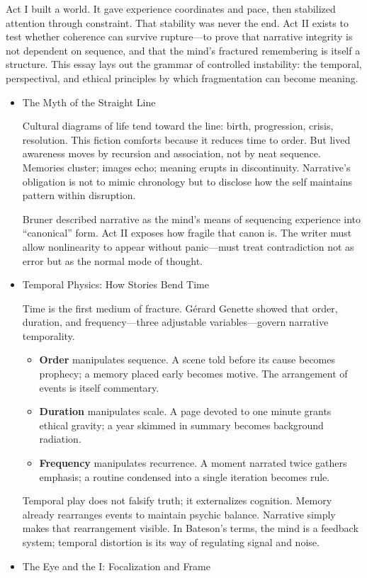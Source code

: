\documentclass[11pt]{article}
\begin{document}
Act I built a world. It gave experience coordinates and pace, then stabilized attention through constraint. That stability was never the end. Act II exists to test whether coherence can survive rupture—to prove that narrative integrity is not dependent on sequence, and that the mind’s fractured remembering is itself a structure. This essay lays out the grammar of controlled instability: the temporal, perspectival, and ethical principles by which fragmentation can become meaning.
\begin{itemize}
\item The Myth of the Straight Line
\label{sec:org8131407}

Cultural diagrams of life tend toward the line: birth, progression, crisis, resolution. This fiction comforts because it reduces time to order. But lived awareness moves by recursion and association, not by neat sequence. Memories cluster; images echo; meaning erupts in discontinuity. Narrative’s obligation is not to mimic chronology but to disclose how the self maintains pattern within disruption.

Bruner described narrative as the mind’s means of sequencing experience into “canonical” form. Act II exposes how fragile that canon is. The writer must allow nonlinearity to appear without panic—must treat contradiction not as error but as the normal mode of thought.
\item Temporal Physics: How Stories Bend Time
\label{sec:org3b10d78}

Time is the first medium of fracture. Gérard Genette showed that order, duration, and frequency—three adjustable variables—govern narrative temporality.

\begin{itemize}
\item \textbf{Order} manipulates sequence. A scene told before its cause becomes prophecy; a memory placed early becomes motive. The arrangement of events is itself commentary.
\item \textbf{Duration} manipulates scale. A page devoted to one minute grants ethical gravity; a year skimmed in summary becomes background radiation.
\item \textbf{Frequency} manipulates recurrence. A moment narrated twice gathers emphasis; a routine condensed into a single iteration becomes rule.
\end{itemize}

Temporal play does not falsify truth; it externalizes cognition. Memory already rearranges events to maintain psychic balance. Narrative simply makes that rearrangement visible. In Bateson’s terms, the mind is a feedback system; temporal distortion is its way of regulating signal and noise.
\item The Eye and the I: Focalization and Frame
\label{sec:org1b01a4f}


\end{itemize}
\end{document}
